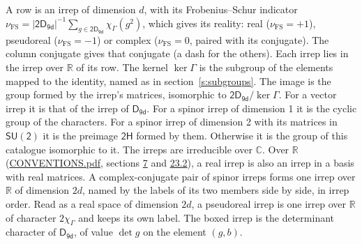 \documentclass[10pt,a4paper]{article}
\numberwithin{equation}{section}
\newcommand{\grp}[1]{\mathsf{#1}}
\newcommand{\irchar}[1]{\chi_{#1}}
\newcommand{\fsind}{\nu_{\mathrm{FS}}}
\begin{document}
\leavevmode\label{n:index.frobenius}\label{n:head.irrep}\label{n:head.reality}A row is an irrep of dimension $d$, with its Frobenius--Schur indicator $\fsind = |\grp{2D_{9d}}|^{-1}\allowbreak\sum_{g\in\grp{2D_{9d}}}\irchar{\Gamma}(g^2)$, which gives its reality: real ($\fsind = +1$), pseudoreal ($\fsind = -1$) or complex ($\fsind = 0$, paired with its conjugate). \label{n:head.conjugate}The column conjugate gives that conjugate (a dash for the others). \label{n:head.over.real}Each irrep lies in the irrep over $\mathbb{R}$ of its row. \label{n:head.kernel}The kernel $\ker\Gamma$ is the subgroup of the elements mapped to the identity, named as in section~\ref{s:subgroups}. \label{n:head.image}The image is the group formed by the irrep's matrices, isomorphic to $\grp{2D_{9d}}/\ker\Gamma$. For a vector irrep it is that of the irrep of \href{../../../rotation/data/pdf/D9d.pdf}{$\grp{D_{9d}}$}. For a spinor irrep of dimension 1 it is the cyclic group of the characters. For a spinor irrep of dimension 2 with its matrices in $\grp{SU(2)}$ it is the preimage $\grp{2H}$ formed by them. Otherwise it is the group of this catalogue isomorphic to it. The irreps are irreducible over $\mathbb{C}$. Over $\mathbb{R}$ (\href{../../CONVENTIONS.pdf}{CONVENTIONS.pdf}, sections \href{../../../rotation/CONVENTIONS.pdf\#conv.7}{7} and \href{../../CONVENTIONS.pdf\#conv.23.2}{23.2}), a real irrep is also an irrep in a basis with real matrices. A complex-conjugate pair of spinor irreps forms one irrep over $\mathbb{R}$ of dimension $2d$, named by the labels of its two members side by side, in irrep order. Read as a real space of dimension $2d$, a pseudoreal irrep is one irrep over $\mathbb{R}$ of character $2\irchar{\Gamma}$ and keeps its own label. \label{n:mark.determinant}The boxed irrep is the determinant character of \href{../../../rotation/data/pdf/D9d.pdf}{$\grp{D_{9d}}$}, of value $\det g$ on the element $(g, b)$.
\setlength{\emergencystretch}{2em}\par\setlength{\emergencystretch}{0pt}
\end{document}
